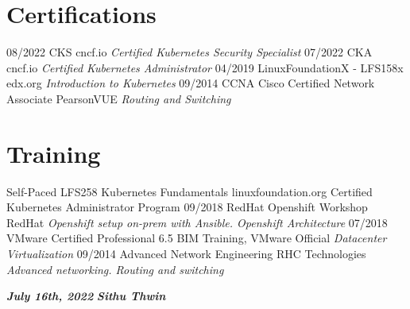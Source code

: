 \documentclass[]{friggeri-cv}
\begin{document}
\section{Certifications}
\begin{entrylist}
  \entry
  {08/2022}
  {CKS}
  {cncf.io}
  {\emph{Certified Kubernetes Security Specialist}}
  \entry
  {07/2022}
  {CKA}
  {cncf.io}
  {\emph{Certified Kubernetes Administrator}}
  \entry
  {04/2019}
  {LinuxFoundationX - LFS158x}
  {edx.org}
  {\emph{Introduction to Kubernetes}}
  \entry
  {09/2014}
  {CCNA Cisco Certified Network Associate}
  {PearsonVUE}
  {\emph{Routing and Switching}}
\end{entrylist}

\section{Training}
\begin{entrylist}
  \entry
  {Self-Paced}
  {LFS258 Kubernetes Fundamentals}
  {linuxfoundation.org}
  {Certified Kubernetes Administrator Program}
  \entry
  {09/2018}
  {RedHat Openshift Workshop}
  {RedHat}
  {\emph{Openshift setup on-prem with Ansible. Openshift Architecture}}	\entry
  {07/2018}
  {VMware Certified Professional 6.5}
  {BIM Training, VMware Official}
  {\emph{Datacenter Virtualization}}
  \entry
  {09/2014}
  {Advanced Network Engineering}
  {RHC Technologies}
  {\emph{Advanced networking. Routing and switching}}
\end{entrylist}

\textbf{\emph{July 16th, 2022}}
\hfill
\textbf{\emph{Sithu Thwin}}
\end{document}
